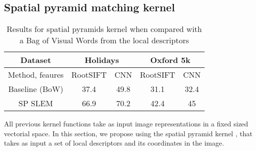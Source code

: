 \vspace{3 mm}






\subsection{Spatial pyramid matching kernel}

\begin{table}[!h]
    \centering
    \caption{Results for spatial pyramids kernel when compared with a Bag of Visual Words from the local descriptors}
    \begin{tabular}{|c|c|c|c|c|}
    \hline
    Dataset & \multicolumn{2}{|c|}{\textbf{Holidays}} & \multicolumn{2}{|c|}{\textbf{Oxford 5k}}\\
    \hline
        Method, feaures & RootSIFT & CNN & RootSIFT
        &CNN \\
    \hline
    \hline
    Baseline (BoW) & 37.4 & 49.8 & 31.1 & 32.4 \\
        SP SLEM    & 66.9 & 70.2 & 42.4 & 45 \\
    \hline
    \end{tabular}
    \label{tab:spk}
\end{table}
All previous kernel functions take as input image representations in a fixed sized vectorial space. In this section, we propose using the spatial pyramid kernel \cite{GrauDa05}, that takes as input a set of local descriptors and its coordinates in the image.


